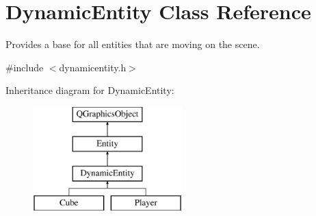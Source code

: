 \hypertarget{class_dynamic_entity}{}\section{Dynamic\+Entity Class Reference}
\label{class_dynamic_entity}


Provides a base for all entities that are moving on the scene.  




{\ttfamily \#include $<$dynamicentity.\+h$>$}

Inheritance diagram for Dynamic\+Entity\+:\begin{figure}[H]
\begin{center}
\leavevmode
\includegraphics[height=4.000000cm]{class_dynamic_entity}
\end{center}
\end{figure}
